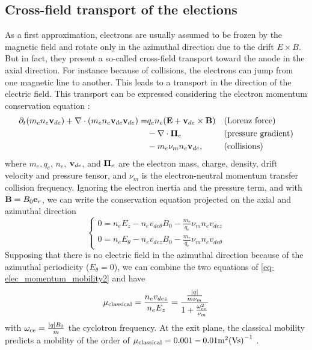 \subsection{Cross-field transport of the elections}
  \label{sec-mob}
  
  As a first approximation, electrons are usually assumed to be frozen by the magnetic field and rotate only in the azimuthal direction due to the drift $E \times B$.
  But in fact, they present a so-called cross-field transport toward the anode in the axial direction.
  For instance because of collisions, the electrons can jump from one magnetic line to another.
  This leads to a transport in the direction of the electric field.
  This transport can be expressed considering the electron momentum conservation equation \citep{lafleur2016a}\string:
  \begin{align*} %
    \partial_t(m_e n_e \vect{v}_{de}) + \div(m_e n_e  \vect{v}_{de} \vect{v}_{de})  = & q_e n_e ( \vect{E} + \vect{v}_{de} \times \vect{B})  &&\text{(Lorenz force)}\\ &- \div \vect{\Pi}_e &&\text{(pressure gradient)}\\ & - m_e \nu_m n_e \vect{v}_{de}, &&\text{(collisions)}
  \end{align*}
  where $m_e, q_e$, $n_e$, ${\mathbf v}_{de}$, and ${\mathbf \Pi}_e $ are the electron mass, charge, density, drift velocity and pressure tensor, and $\nu_m$ is the electron-neutral momentum transfer collision frequency.
  Ignoring the electron inertia and the pressure term, and with ${\mathbf B} = B_0 {\mathbf e}_r$, we can write the conservation equation projected on the axial and azimuthal direction
  \begin{equation} \label{eq-elec_momentum_mobility2}
  \begin{cases}
    0 =  n_e E_z - n_e v_{de{\theta}} B_0 - \frac{m_e}{q_e} \nu_m n_e v_{dez}\\
    0 =  n_e E_{\theta} -  n_e v_{dez} B_0 - \frac{m_e}{q_e} \nu_m n_e v_{de{\theta}}
  \end{cases}
  \end{equation}
  Supposing that there is no electric field in the azimuthal direction because of the azimuthal periodicity ($E_{\theta}=0$),  we can combine the two equations of \cref{eq-elec_momentum_mobility2} and have \citep{chen2006,meezan2001}
  \begin{equation} \label{eq-mobility}
    \mu_{\mathrm{classical}} = \frac{n_e v_{dez}}{n_e E_z} = \frac{ \frac{\lvert q\rvert}{m \nu_m}}{1 + \frac{\omega_{ce}^2}{\nu_m}}
  \end{equation}
  with $\omega_{ce}= \frac{\lvert q\rvert B_0}{m}$ the cyclotron frequency.
  At the exit plane, the classical mobility predicts a mobility of the order of $\mu_{\mathrm{classical}}=0.001-0.01 \text{m}^2\text{(Vs)}^{-1}$ \citep{adam2008a}.
    
